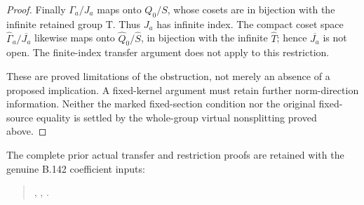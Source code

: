 \begin{proof}
Finally \(\Gamma_a/J_a\) maps onto \(Q_0/S\), whose
cosets are in bijection with the infinite retained group T.
Thus \(J_a\) has infinite index. The compact coset space
\(\widehat\Gamma_a/\overline{J_a}\) likewise maps onto
\(\widehat Q_0/\widehat S\), in bijection with the infinite
\(\widehat T\); hence \(\overline{J_a}\) is not open.
The finite-index transfer argument does not apply to this
restriction.

These are proved limitations of the obstruction, not merely
an absence of a proposed implication. A fixed-kernel argument
must retain further norm-direction information. Neither the
marked fixed-section condition nor the original fixed-source
equality is settled by the whole-group virtual nonsplitting
proved above.
\end{proof}

The complete prior actual transfer and restriction proofs are retained
with the genuine B.142 coefficient inputs:
\begin{quote}\footnotesize\raggedright
{},
,
.
\end{quote}
